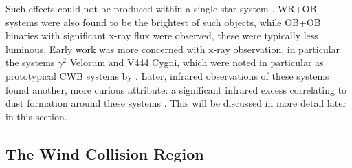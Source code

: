 \noindent
Such effects could not be produced within a single star system \parencite{pittard_x-ray_1999}.
WR+OB systems were also found to be the brightest of such objects, while OB+OB binaries with significant x-ray flux were observed, these were typically less luminous.
Early work was more concerned with x-ray observation, in particular the systems $\gamma^2$ Velorum and V444 Cygni, which were noted in particular as prototypical CWB systems by \textcite{prilutskii_x_1976}.
Later, infrared observations of these systems found another, more curious attribute: a significant infrared excess correlating to dust formation around these systems \parencite{williamsInfraredPhotometryLatetype1987}.
This will be discussed in more detail later in this section.

\subsection{The Wind Collision Region}
\label{sec:wcr}

